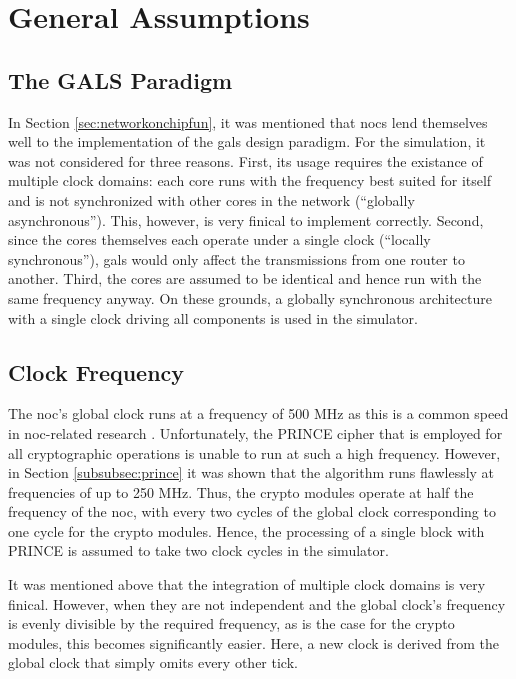 \section{General Assumptions}\label{sec:generalass}
\subsection{The GALS Paradigm}
In Section \ref{sec:networkonchipfun}, it was mentioned that \glspl{noc} lend themselves well to the implementation of the \gls{gals} design paradigm.
For the simulation, it was not considered for three reasons. First, its usage requires the existance of multiple clock domains: each core runs with the
frequency best suited for itself and is not synchronized with other cores in the network (\enquote{globally asynchronous}). This, however, is very
finical to implement correctly. Second, since the cores themselves each operate under a single clock (\enquote{locally synchronous}), \gls{gals} would
only affect the transmissions from one router to another. Third, the cores are assumed to be identical and hence run with the same frequency anyway.
On these grounds, a globally synchronous architecture with a single clock driving all components is used in the simulator.

\subsection{Clock Frequency}
The \gls{noc}'s global clock runs at a frequency of 500 MHz as this is a common speed in \gls{noc}-related research
\cites{frey15stateobfuscation}{frey17hardenednoc}. Unfortunately, the PRINCE cipher that is employed for all cryptographic operations is unable to run at
such a high frequency. However, in Section \ref{subsubsec:prince} it was shown that the algorithm runs flawlessly at frequencies of up to 250 MHz.
Thus, the crypto modules operate at half the frequency of the \gls{noc}, with every two cycles of the global clock corresponding to one
cycle for the crypto modules. Hence, the processing of a single block with PRINCE is assumed to take two clock cycles in the simulator.

It was mentioned above that the integration of multiple clock domains is very finical. However, when they are not independent and the global clock's
frequency is evenly divisible by the required frequency, as is the case for the crypto modules, this becomes significantly easier. Here, a new clock
is derived from the global clock that simply omits every other tick.

